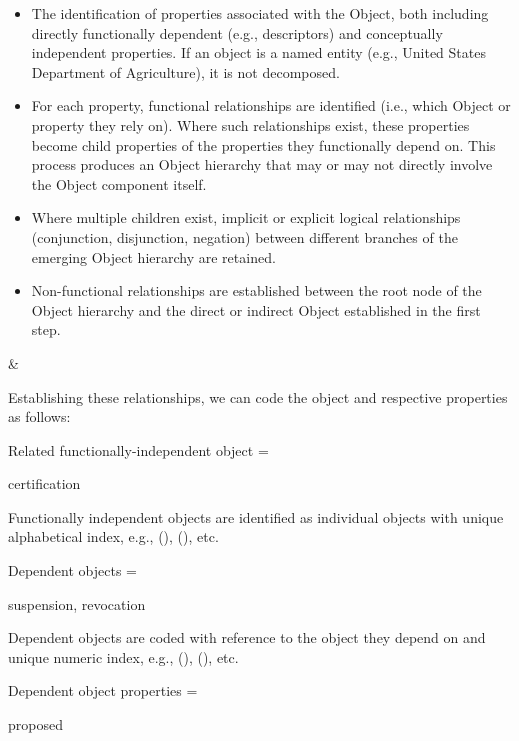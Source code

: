 \begin{landscape}
\begin{longtable}{\tabledims}
\begin{itemize}
	\item The identification of properties associated with the Object, both including directly functionally dependent (e.g., descriptors) and conceptually independent properties. If an object is a named entity (e.g., United States Department of Agriculture), it is not decomposed.
    \item For each property, functional relationships are identified (i.e., which Object or property they rely on). Where such relationships exist, these properties become child properties of the properties they functionally depend on. This process produces an Object hierarchy that may or may not directly involve the Object component itself.
    \item Where multiple children exist, implicit or explicit logical relationships (conjunction, disjunction, negation) between different branches of the emerging Object hierarchy are retained.
    \item Non-functional relationships are established between the root node of the Object hierarchy and the direct or indirect Object established in the first step.
\end{itemize}

& 

\sp

Establishing these relationships, we can code the object and respective properties as follows:

\sp

Related functionally-independent object = \begin{exi}certification\end{exi}

\sp

Functionally independent objects are identified as individual objects with unique alphabetical index, e.g., (), (), etc.

\sp

Dependent objects = \begin{exi}suspension, revocation\end{exi}

\sp

Dependent objects are coded with reference to the object they depend on and unique numeric index, e.g., (), (), etc.

\sp

Dependent object properties = \begin{exi}proposed\end{exi}


\end{longtable}
\end{landscape}
